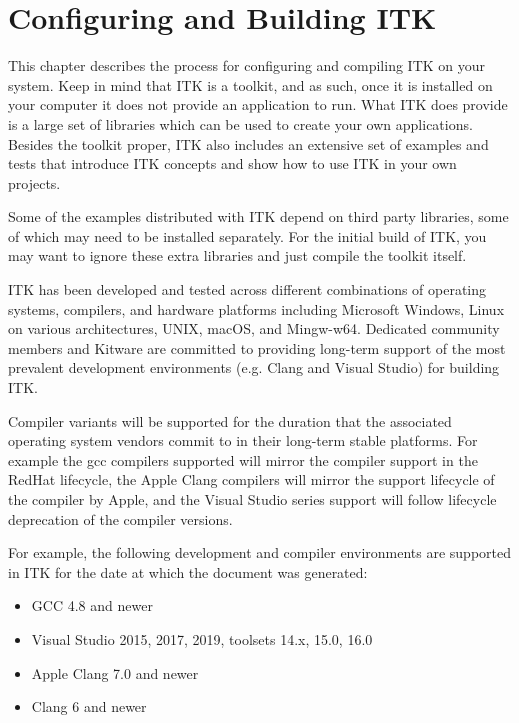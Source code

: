 \chapter{Configuring and Building ITK}
\label{chapter:Installation}

This chapter describes the process for configuring and compiling ITK on your
system. Keep in mind that ITK is a toolkit, and as such, once it is installed
on your computer it does not provide an application to run. What ITK does
provide is a large set of libraries which can be used to create your own
applications. Besides the toolkit proper, ITK also includes an extensive set of
examples and tests that introduce ITK concepts and show how to use ITK in your
own projects.

Some of the examples distributed with ITK depend on third party libraries, some
of which may need to be installed separately. For the initial build of ITK, you
may want to ignore these extra libraries and just compile the toolkit itself.

ITK has been developed and tested across different combinations of operating
systems, compilers, and hardware platforms including Microsoft Windows, Linux on
various architectures, UNIX, macOS, and Mingw-w64. Dedicated community members and
Kitware are committed to providing long-term support of the most prevalent
development environments (e.g. Clang and Visual Studio) for building ITK.

Compiler variants will be supported for the duration that the associated operating
system vendors commit to in their long-term stable platforms. For example the gcc
compilers supported will mirror the compiler support in the RedHat lifecycle, the
Apple Clang compilers will mirror the support lifecycle of the compiler by Apple, and
the Visual Studio series support will follow lifecycle deprecation of the compiler
versions.

For example, the following development and compiler environments are supported
in ITK for the date at which the document was generated:
\begin{itemize}
\item GCC 4.8 and newer
\item Visual Studio 2015, 2017, 2019, toolsets 14.x, 15.0, 16.0
\item Apple Clang 7.0 and newer
\item Clang 6 and newer
\end{itemize}


